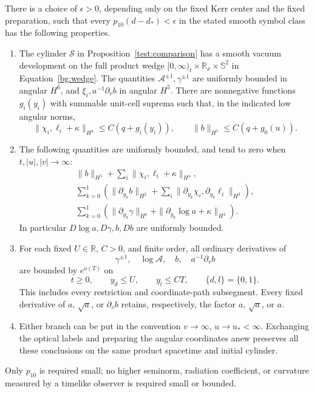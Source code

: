 \begin{proposition}\label{bg:geometry}
There is a choice of $\epsilon>0$, depending only on the fixed Kerr
center and the fixed preparation, such that every
$p_{10}(d-d_*)<\epsilon$ in the stated smooth symbol class has the
following properties.
\begin{enumerate}
\item The cylinder $\mathcal S$ in Proposition~\ref{test:comparison}
has a smooth vacuum development on the full product wedge
$[0,\infty)_t\times\mathbb R_x\times\mathbb S^2$ in
Equation~\eqref{bg:wedge}.  The quantities
$\mathcal A^{\pm1},\gamma^{\pm1}$ are uniformly bounded in angular
$H^6$, and $\xi_i,a^{-1}\partial_vb$ in angular $H^5$.
There are nonnegative functions $g_i(y_i)$ with summable unit-cell
suprema such that, in the indicated low angular norms,
\begin{equation}\label{bg:envelopes}
 \|\chi_i,\ell_i+\kappa\|_{H^4}\le C(q+g_i(y_i)),
 \qquad \|b\|_{H^5}\le C(q+g_0(u)).
\end{equation}
\item The following quantities are uniformly bounded, and tend to
zero when $t,|u|,|v|\to\infty$:
\begin{equation}\label{bg:low-limits}
\begin{gathered}
 \|b\|_{H^5}+\sum_i\|\chi_i,\ell_i+\kappa\|_{H^4},\\
 \sum_{k=0}^1\left(\|\partial_{y_k}b\|_{H^2}
       +\sum_i\|\partial_{y_k}\chi_i,
                          \partial_{y_k}\ell_i\|_{H^2}\right),\\
 \sum_{k=0}^1\left(\|\partial_{y_k}\gamma\|_{H^4}
                 +\|\partial_{y_k}\log a+\kappa\|_{H^4}\right).
\end{gathered}
\end{equation}
In particular $D\log a,D\gamma,b,Db$ are uniformly bounded.
\item For each fixed $U\in\mathbb R$, $C>0$, and finite order,
all ordinary derivatives of
\begin{equation}\label{bg:high-arrays}
 \gamma^{\pm1},\quad\log\mathcal A,\quad b,
                  \quad a^{-1}\partial_vb
\end{equation}
are bounded by $e^{o(T)}$ on
\begin{equation}\label{bg:truncation}
 t\ge0,\qquad y_d\le U,\qquad y_l\le CT,
 \qquad \{d,l\}=\{0,1\}.
\end{equation}
This includes every restriction and coordinate-path subsegment.
Every fixed derivative of $a$, $\sqrt a$, or $\partial_vb$ retains,
respectively, the factor $a$, $\sqrt a$, or $a$.
\item Either branch can be put in the convention
$v\to\infty$, $u\to u_*<\infty$.  Exchanging the optical labels
and preparing the angular coordinates anew preserves all these
conclusions on the same product spacetime and initial cylinder.
\end{enumerate}
Only $p_{10}$ is required small; no higher seminorm, radiation
coefficient, or curvature measured by a timelike observer is required
small or bounded.
\end{proposition}

